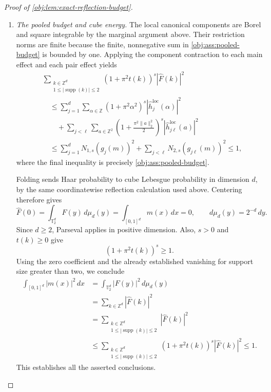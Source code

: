 \begin{proof}[Proof of \cref{obj:lem:exact-reflection-budget}]
\begin{enumerate}
\item \textit{The pooled budget and cube energy.}
The local canonical components are Borel and square integrable by the marginal argument above. Their restriction norms are finite because the finite, nonnegative sum in \cref{obj:ass:pooled-budget} is bounded by one. Applying the component contraction to each main effect and each pair effect yields
\[
\begin{aligned}
&\sum_{\substack{k\in\mathbb Z^d\\1\leq|\operatorname{supp}(k)|\leq2}}
(1+\pi^2t(k))^s|\widehat F(k)|^2\\
&\quad\leq
\sum_{j=1}^d\sum_{\alpha\in\mathbb Z}
(1+\pi^2\alpha^2)^s|\widehat h_j^{\mathrm{loc}}(\alpha)|^2\\
&\qquad+
\sum_{j<\ell}\sum_{a\in\mathbb Z^2}
\left(1+\frac{\pi^2\|a\|_2^2}{2}\right)^s
|\widehat h_{j\ell}^{\mathrm{loc}}(a)|^2\\
&\quad\leq
\sum_{j=1}^dN_{1,s}(g_j(m))^2
+
\sum_{j<\ell}N_{2,s}(g_{j\ell}(m))^2
\leq1,
\end{aligned}
\]
where the final inequality is precisely \cref{obj:ass:pooled-budget}.

Folding sends Haar probability to cube Lebesgue probability in dimension \(d\), by the same coordinatewise reflection calculation used above. Centering therefore gives
\[
\widehat F(0)
=
\int_{\mathbb T_2^d}F(y)\,d\mu_d(y)
=
\int_{[0,1]^d}m(x)\,dx
=
0,
\qquad d\mu_d(y)=2^{-d}\,dy.
\]
Since \(d\geq2\), Parseval applies in positive dimension. Also, \(s>0\) and \(t(k)\geq0\) give
\[
(1+\pi^2t(k))^s\geq1.
\]
Using the zero coefficient and the already established vanishing for support size greater than two, we conclude
\[
\begin{aligned}
\int_{[0,1]^d}|m(x)|^2\,dx
&=
\int_{\mathbb T_2^d}|F(y)|^2\,d\mu_d(y)\\
&=
\sum_{k\in\mathbb Z^d}|\widehat F(k)|^2\\
&=
\sum_{\substack{k\in\mathbb Z^d\\1\leq|\operatorname{supp}(k)|\leq2}}
|\widehat F(k)|^2\\
&\leq
\sum_{\substack{k\in\mathbb Z^d\\1\leq|\operatorname{supp}(k)|\leq2}}
(1+\pi^2t(k))^s|\widehat F(k)|^2
\leq1.
\end{aligned}
\]
This establishes all the asserted conclusions.
\end{enumerate}
\end{proof}
